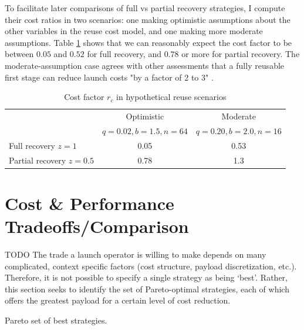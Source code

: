 \documentclass[conf]{new-aiaa}
\begin{document}
To facilitate later comparisons of full vs partial recovery strategies, I compute their cost ratios in two scenarios: one making optimistic assumptions about the other variables in the reuse cost model, and one making more moderate assumptions. Table \ref{tab:cost_scenarios} shows that we can reasonably expect the cost factor to be between $0.05$ and $0.52$ for full recovery, and $0.78$ or more for partial recovery. The moderate-assumption case agrees with other assessments that a fully reusable first stage can reduce launch costs "by a factor of 2 to 3" \cite{Hampsten2010}.

\begin{table}
\caption{\label{tab:cost_scenarios} Cost factor $r_c$ in hypothetical reuse scenarios}
\centering
\begin{tabular}{lcc}
\hline
& Optimistic & Moderate \\
& $q=0.02, b=1.5, n=64$ & $q=0.20, b=2.0, n=16$ \\
\hline
Full recovery $z=1$ & 0.05 & 0.53 \\
Partial recovery $z=0.5$ & 0.78 & 1.3 \\
\hline
\end{tabular}
\end{table}


\section{Cost \& Performance Tradeoffs/Comparison}
TODO
The trade a launch operator is willing to make depends on many complicated, context specific factors (cost structure, payload discretization, etc.). Therefore, it is not possible to specify a single strategy as being `best'. Rather, this section seeks to identify the set of Pareto-optimal strategies, each of which offers the greatest payload for a certain level of cost reduction.

Pareto set of best strategies.



\end{document}
